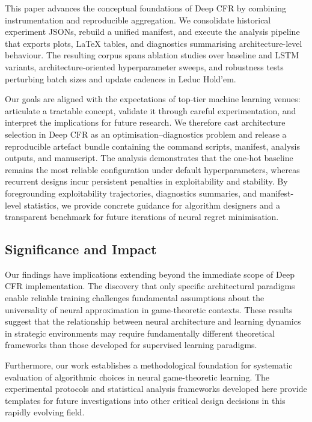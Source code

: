 \documentclass[10pt,twocolumn]{article}
\theoremstyle{definition}
\begin{document}
This paper advances the conceptual foundations of Deep CFR by combining instrumentation and reproducible aggregation. We consolidate historical experiment JSONs, rebuild a unified manifest, and execute the analysis pipeline that exports plots, LaTeX tables, and diagnostics summarising architecture-level behaviour. The resulting corpus spans ablation studies over baseline and LSTM variants, architecture-oriented hyperparameter sweeps, and robustness tests perturbing batch sizes and update cadences in Leduc Hold'em.

Our goals are aligned with the expectations of top-tier machine learning venues: articulate a tractable concept, validate it through careful experimentation, and interpret the implications for future research. We therefore cast architecture selection in Deep CFR as an optimisation–diagnostics problem and release a reproducible artefact bundle containing the command scripts, manifest, analysis outputs, and manuscript. The analysis demonstrates that the one-hot baseline remains the most reliable configuration under default hyperparameters, whereas recurrent designs incur persistent penalties in exploitability and stability. By foregrounding exploitability trajectories, diagnostics summaries, and manifest-level statistics, we provide concrete guidance for algorithm designers and a transparent benchmark for future iterations of neural regret minimisation.

\subsection{Significance and Impact}

Our findings have implications extending beyond the immediate scope of Deep CFR implementation. The discovery that only specific architectural paradigms enable reliable training challenges fundamental assumptions about the universality of neural approximation in game-theoretic contexts. These results suggest that the relationship between neural architecture and learning dynamics in strategic environments may require fundamentally different theoretical frameworks than those developed for supervised learning paradigms.

Furthermore, our work establishes a methodological foundation for systematic evaluation of algorithmic choices in neural game-theoretic learning. The experimental protocols and statistical analysis frameworks developed here provide templates for future investigations into other critical design decisions in this rapidly evolving field.
\end{document}
